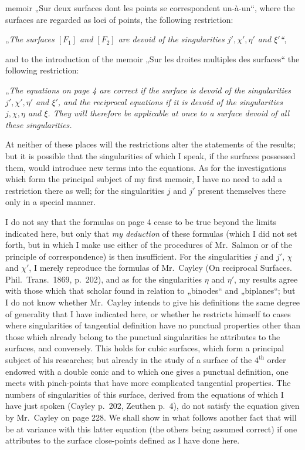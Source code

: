 \documentclass{article}
\begin{document}
memoir „Sur deux surfaces dont les points se correspondent un-à-un“, where the surfaces are regarded as loci of points, the following restriction:

„\emph{The surfaces $[F_1]$ and $[F_2]$ are devoid of the singularities $j', \chi', \eta'$ and $\xi'$“},

and to the introduction of the memoir „Sur les droites multiples des surfaces“ the following restriction:

„\emph{The equations on page 4 are correct if the surface is devoid of the singularities $j', \chi', \eta'$ and $\xi'$, and the reciprocal equations if it is devoid of the singularities $j, \chi, \eta$ and $\xi$. They will therefore be applicable at once to a surface devoid of all these singularities.}

At neither of these places will the restrictions alter the statements of the results; but it is possible that the singularities of which I speak, if the surfaces possessed them, would introduce new terms into the equations. As for the investigations which form the principal subject of my first memoir, I have no need to add a restriction there as well; for the singularities $j$ and $j'$ present themselves there only in a special manner.

I do not say that the formulas on page 4 cease to be true beyond the limits indicated here, but only that \emph{my deduction} of these formulas (which I did not set forth, but in which I make use either of the procedures of Mr.~Salmon or of the principle of correspondence) is then insufficient. For the singularities $j$ and $j'$, $\chi$ and $\chi'$, I merely reproduce the formulas of Mr.~Cayley (On reciprocal Surfaces. Phil.\ Trans.\ 1869, p.~202), and as for the singularities $\eta$ and $\eta'$, my results agree with those which that scholar found in relation to „binodes“ and „biplanes“; but I do not know whether Mr.~Cayley intends to give his definitions the same degree of generality that I have indicated here, or whether he restricts himself to cases where singularities of tangential definition have no punctual properties other than those which already belong to the punctual singularities he attributes to the surfaces, and conversely. This holds for cubic surfaces, which form a principal subject of his researches; but already in the study of a surface of the $4^{\text{th}}$ order endowed with a double conic and to which one gives a punctual definition, one meets with pinch-points that have more complicated tangential properties. The numbers of singularities of this surface, derived from the equations of which I have just spoken (Cayley p.~202, Zeuthen p.~4), do not satisfy the equation given by Mr.~Cayley on page 228. We shall show in what follows another fact that will be at variance with this latter equation (the others being assumed correct) if one attributes to the surface close-points defined as I have done here.
\end{document}

